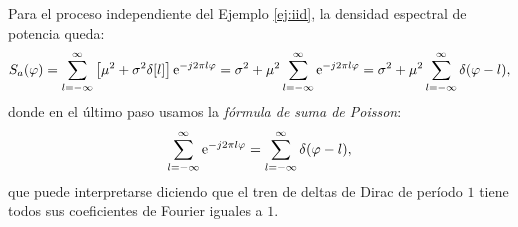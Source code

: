 \begin{ejemplo}
    Para el proceso independiente del Ejemplo \ref{ej:iid}, la densidad espectral de potencia queda:
    \begin{equation*}
        S_a(\varphi) = \sum_{l=-\infty}^\infty \left[\mu^2 + \sigma^2 \delta[l]\right]\mathrm{e}^{-j2\pi l \varphi} = \sigma^2 + \mu^2 \sum_{l=-\infty}^\infty \mathrm{e}^{-j2\pi l \varphi} = \sigma^2 + \mu^2 \sum_{l=-\infty}^\infty \delta(\varphi-l),
    \end{equation*}
donde en el último paso usamos la \emph{fórmula de suma de Poisson}:
\begin{equation}\label{eq:suma de poisson}
    \sum_{l=-\infty}^\infty \mathrm{e}^{-j2\pi l \varphi} = \sum_{l=-\infty}^\infty \delta(\varphi-l),
\end{equation}
que puede interpretarse diciendo que el tren de deltas de Dirac de período $1$ tiene todos sus coeficientes de Fourier iguales a $1$.
    \begin{center}
\end{center}

\end{ejemplo}


